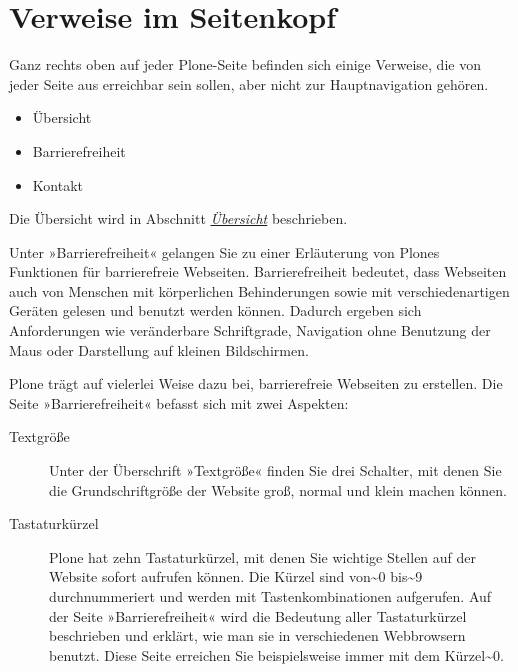 \documentclass[a4paper,12pt,ngerman]{manual}
\begin{document}
\resetcurrentobjects
\hypertarget{--doc-oberflaeche/site-aktionen}{}

\section{Verweise im Seitenkopf}

Ganz rechts oben auf jeder Plone-Seite befinden sich einige Verweise, die
von jeder Seite aus erreichbar sein sollen, aber nicht zur Hauptnavigation
gehören.
\begin{itemize}
\item {} 
Übersicht

\item {} 
Barrierefreiheit

\item {} 
Kontakt

\end{itemize}

Die Übersicht wird in Abschnitt \hyperlink{sec-sitemap}{\emph{Übersicht}} beschrieben.

Unter »Barrierefreiheit« gelangen Sie zu einer Erläuterung von Plones
Funktionen für barrierefreie Webseiten. Barrierefreiheit bedeutet, dass
Webseiten auch von Menschen mit körperlichen Behinderungen sowie mit
verschiedenartigen Geräten gelesen und benutzt werden können. Dadurch ergeben
sich Anforderungen wie veränderbare Schriftgrade, Navigation ohne Benutzung
der Maus oder Darstellung auf kleinen Bildschirmen.

Plone trägt auf vielerlei Weise dazu bei, barrierefreie Webseiten zu
erstellen. Die Seite »Barrierefreiheit« befasst sich mit zwei Aspekten:
\begin{description}
\item[Textgröße] \leavevmode
Unter der Überschrift »Textgröße« finden Sie drei Schalter,
mit denen Sie die Grundschriftgröße der Website groß, normal und klein
machen können.

\item[Tastaturkürzel] \leavevmode
Plone hat zehn Tastaturkürzel, mit denen Sie wichtige Stellen auf
der Website sofort aufrufen können. Die Kürzel sind von\textasciitilde{}0 bis\textasciitilde{}9
durchnummeriert und werden mit Tastenkombinationen aufgerufen.  Auf
der Seite »Barrierefreiheit« wird die Bedeutung aller Tastaturkürzel
beschrieben und erklärt, wie man sie in verschiedenen Webbrowsern
benutzt. Diese Seite erreichen Sie beispielsweise immer mit dem
Kürzel\textasciitilde{}0.

\end{description}
\end{document}
